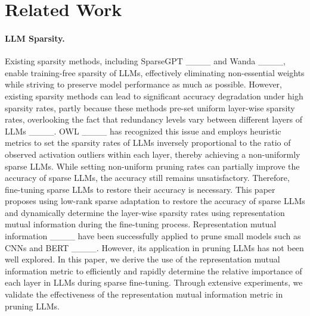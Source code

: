 \section{Related Work}
\label{RelatedWork}
\paragraph{LLM Sparsity.} 
Existing sparsity methods, including SparseGPT ____ and Wanda ____, enable training-free sparsity of LLMs, effectively eliminating non-essential weights while striving to preserve model performance as much as possible. However, existing sparsity methods can lead to significant accuracy degradation under high sparsity rates, partly because these methods pre-set uniform layer-wise sparsity rates, overlooking the fact that redundancy levels vary between different layers of LLMs ____. OWL ____ has recognized this issue and employs heuristic metrics to set the sparsity rates of LLMs inversely proportional to the ratio of observed activation outliers within each layer, thereby achieving a non-uniformly sparse LLMs. While setting non-uniform pruning rates can partially improve the accuracy of sparse LLMs, the accuracy still remains unsatisfactory. Therefore, fine-tuning sparse LLMs to restore their accuracy is necessary. This paper proposes using low-rank sparse adaptation to restore the accuracy of sparse LLMs and dynamically determine the layer-wise sparsity rates using representation mutual information during the fine-tuning process. Representation mutual information ____ have been successfully applied to prune small models such as CNNs and BERT ____. However, its application in pruning LLMs has not been well explored. In this paper, we derive the use of the representation mutual information metric to efficiently and rapidly determine the relative importance of each layer in LLMs during sparse fine-tuning. Through extensive experiments, we validate the effectiveness of the representation mutual information metric in pruning LLMs.



